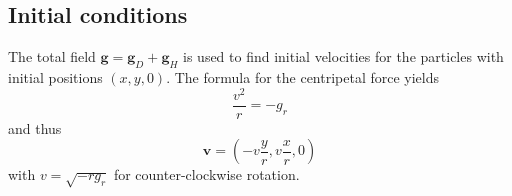 \subsection{Initial conditions}
The total field $\mathbf{g} = \mathbf{g}_D + \mathbf{g}_H$ is used to find initial velocities for the particles with initial positions $(x, y, 0)$.
The formula for the centripetal force yields
\begin{equation*}
    \frac{v^2}{r} = -g_r
\end{equation*}
and thus
\begin{equation*}
    \mathbf{v} = \left(-v \frac{y}{r}, v\frac{x}{r}, 0\right)
\end{equation*}
with $v = \sqrt{- r g_r}$
for counter-clockwise rotation.
